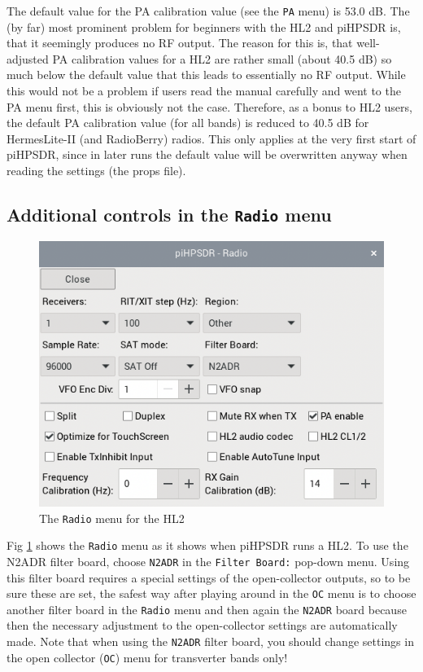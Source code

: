 \documentclass[12pt]{book}
\def\rett#1{\texttt{\color{red}#1}}
\def\bltt#1{\texttt{\color{blue}#1}}
\def\pH{pi\-HPSDR\xspace}
\begin{document}
The default value for the PA calibration value (see the \bltt{PA} menu) is 53.0 dB. The (by far) most
prominent  problem for beginners with the HL2 and \pH is, that it seemingly produces no RF output. The reason for this
is, that well-adjusted PA calibration values for a HL2 are rather small (about 40.5 dB) so much below the default
value that this leads to essentially no RF output. While this would not be a problem if  users read the manual
carefully and went to the PA menu first, this is obviously not the case. Therefore, as a bonus to HL2 users,
the default PA calibration value (for all bands) is
reduced to 40.5 dB for HermesLite-II (and RadioBerry) radios. This only applies at the very first start
of \pH, since in later runs the default value will be overwritten anyway when reading the settings (the props
file).



\subsection{Additional controls in the \bltt{Radio} menu}

\begin{figure}[ht]
\center
\includegraphics[scale=0.45]{RadioMenuHL2.png}
\caption{The \bltt{Radio} menu for the HL2}
\label{fig:hl2radiomenu}
\end{figure}

 Fig \ref{fig:hl2radiomenu} shows the \bltt{Radio} menu as it shows when \pH runs a HL2. To use the N2ADR
 filter board, choose \texttt{N2ADR} in the \rett{Filter Board:} pop-down menu. Using this filter board
 requires a special settings of the open-collector outputs, so to be sure these are set, the safest way
 after playing around in the \bltt{OC} menu
 is to choose another filter board in the \bltt{Radio} menu and then again the \texttt{N2ADR} board
 because then the necessary adjustment to the open-collector settings are automatically made.
 Note that when
 using the \texttt{N2ADR} filter board, you should  change  settings in the open collector (\bltt{OC})
 menu for transverter bands only!
\end{document}
